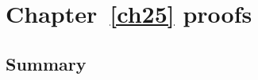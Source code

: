 \chapter{Chapter~\ref{ch25} proofs}

\newpage
\section{Summary}\label{ch25.ps.summary}
\lpscriptsummary
